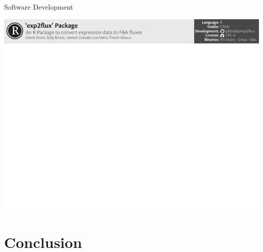 \documentclass[11pt]{beamer}
\begin{document}
\begin{frame}{Software Development}
\begin{center}
\includegraphics[width=\textwidth]{exp2flux}
\end{center}
\end{frame}
\section{Conclusion}
\begin{frame}

\end{frame}
\end{document}
